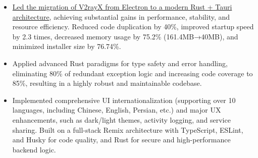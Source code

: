 \documentclass{resume}
\newcommand{\en}[1]{#1}
\newcommand{\zh}[1]{}
\begin{document}
\en{}
\zh{\datedsubsection{\textbf{\href{https://github.com/shaonhuang/V2rayX}{跨平台代理客户端 – V2rayX（Rust/Tauri 2 重构版本）}}}{}}
\begin{itemize}
    \item \en{\href{\detokenize{https://shaonhuang.vercel.app/posts/v2rayx-refactor}}{Led the migration of V2rayX from Electron to a modern Rust + Tauri architecture}, achieving substantial gains in performance, stability, and resource efficiency. Reduced code duplication by 40\%, improved startup speed by 2.3 times, decreased memory usage by 75.2\% (161.4MB→40MB), and minimized installer size by 76.74\%.}
          \zh{\href{\detokenize{https://shaonhuang.vercel.app/posts/v2rayx-refactor}}{将 Electron 版本迁移至 Tauri + Rust 架构}，显著提升应用性能和稳定性，减少资源占用。代码重复率减少40\%。应用启动速度提升 2.3倍，内存占用减少 75.2\%(161.4M -> 40M)。安装包体积下降约76.74\%。}
    \item \en{Applied advanced Rust paradigms for type safety and error handling, eliminating 80\% of redundant exception logic and increasing code coverage to 85\%, resulting in a highly robust and maintainable codebase.}
          \zh{利用 Rust 的类型安全和错误处理机制设计思想，减少重复的异常处理代码，提高代码质量和可维护性。删除 80\% 重复异常检测代码，代码覆盖率提高至 85\%。}
    \item \en{Implemented comprehensive UI internationalization (supporting over 10 languages, including Chinese, English, Persian, etc.) and major UX enhancements, such as dark/light themes, activity logging, and service sharing. Built on a full-stack Remix architecture with TypeScript, ESLint, and Husky for code quality, and Rust for secure and high-performance backend logic.}
          \zh{增加 UI 国际化与 UX 设计，支持十种以上语言（中、英、波斯等）和暗黑/浅色主题；实现活动日志、服务分享等实用增强功能，基于 Remix 全栈架构，采用 TypeScript、ESLint、Husky 保证代码质量，后端逻辑使用 Rust 实现安全性能兼顾。}
\end{itemize}
\end{document}
